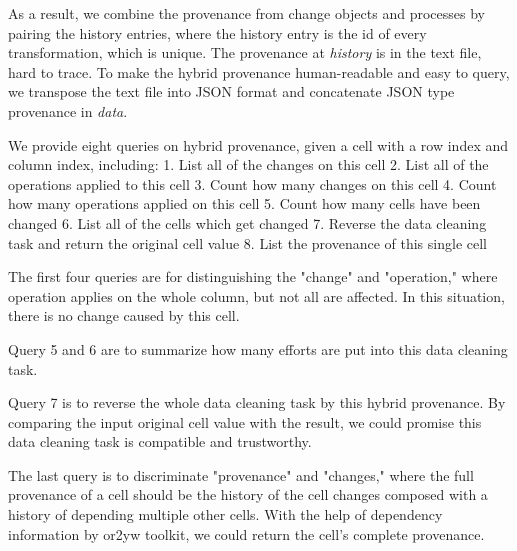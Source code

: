 As a result, we combine the provenance from change objects and processes by pairing the history entries, where the history entry is the id of every transformation, which is unique. The provenance at \textit{history} is in the text file, hard to trace. To make the hybrid provenance human-readable and easy to query, we transpose the text file into JSON format and concatenate JSON type provenance in \textit{data}. 

We provide eight queries on hybrid provenance, given a cell with a row index and column index, including:
1. List all of the changes on this cell
2. List all of the operations applied to this cell
3. Count how many changes on this cell
4. Count how many operations applied on this cell
5. Count how many cells have been changed
6. List all of the cells which get changed
7. Reverse the data cleaning task and return the original cell value
8. List the provenance of this single cell

The first four queries are for distinguishing the "change" and "operation," where operation applies on the whole column, but not all are affected. In this situation, there is no change caused by this cell. 

Query 5 and 6 are to summarize how many efforts are put into this data cleaning task. 

Query 7 is to reverse the whole data cleaning task by this hybrid provenance. By comparing the input original cell value with the result, we could promise this data cleaning task is compatible and trustworthy. 

The last query is to discriminate "provenance" and "changes," where the full provenance of a cell should be the history of the cell changes composed with a history of depending multiple other cells\cite{nunez2020first}. With the help of dependency information by or2yw toolkit, we could return the cell's complete provenance. 
